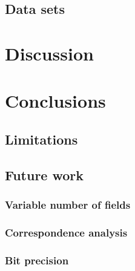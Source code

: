 \documentclass[a4paper]{report}
\begin{document}
\section{Data sets}
\chapter{Discussion}
\chapter{Conclusions}
\section{Limitations}
\section{Future work}
\subsection{Variable number of fields}
\subsection{Correspondence analysis}
\subsection{Bit precision}



\end{document}
